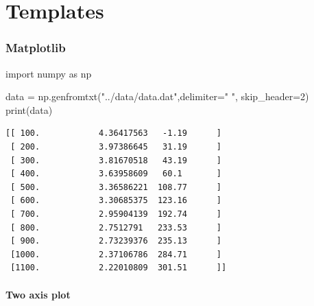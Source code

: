 \documentclass[
  letterpaper,
]{article}
\newenvironment{Shaded}{\begin{snugshade}}{\end{snugshade}}
\newcommand{\BuiltInTok}[1]{\textcolor[rgb]{0.00,0.23,0.31}{#1}}
\newcommand{\DecValTok}[1]{\textcolor[rgb]{0.68,0.00,0.00}{#1}}
\newcommand{\ImportTok}[1]{\textcolor[rgb]{0.00,0.46,0.62}{#1}}
\newcommand{\NormalTok}[1]{\textcolor[rgb]{0.00,0.23,0.31}{#1}}
\newcommand{\OperatorTok}[1]{\textcolor[rgb]{0.37,0.37,0.37}{#1}}
\newcommand{\StringTok}[1]{\textcolor[rgb]{0.13,0.47,0.30}{#1}}
\begin{document}
\part{Templates}

\hypertarget{matplotlib}{%
\section{Matplotlib}\label{matplotlib}}

\begin{Shaded}
\begin{Highlighting}[]
\ImportTok{import}\NormalTok{ numpy }\ImportTok{as}\NormalTok{ np}

\NormalTok{data }\OperatorTok{=}\NormalTok{ np.genfromtxt(}\StringTok{"../data/data.dat"}\NormalTok{,delimiter}\OperatorTok{=}\StringTok{"   "}\NormalTok{, skip\_header}\OperatorTok{=}\DecValTok{2}\NormalTok{)}
\BuiltInTok{print}\NormalTok{(data)}
\end{Highlighting}
\end{Shaded}

\begin{verbatim}
[[ 100.            4.36417563   -1.19      ]
 [ 200.            3.97386645   31.19      ]
 [ 300.            3.81670518   43.19      ]
 [ 400.            3.63958609   60.1       ]
 [ 500.            3.36586221  108.77      ]
 [ 600.            3.30685375  123.16      ]
 [ 700.            2.95904139  192.74      ]
 [ 800.            2.7512791   233.53      ]
 [ 900.            2.73239376  235.13      ]
 [1000.            2.37106786  284.71      ]
 [1100.            2.22010809  301.51      ]]
\end{verbatim}

\hypertarget{two-axis-plot}{%
\subsection*{Two axis plot}\label{two-axis-plot}}

\end{document}
